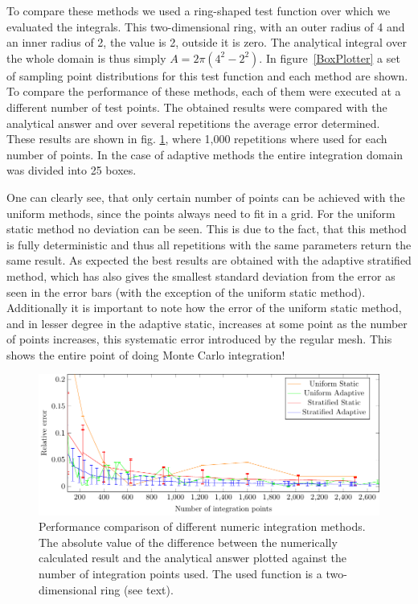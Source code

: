 To compare these methods we used a ring-shaped test function over which we evaluated the integrals. This two-dimensional ring, with an outer radius of 4 and an inner radius of 2, the value is 2, outside it is zero. The analytical integral over the whole domain is thus simply $ A=2\pi (4^2-2^2)$.  In figure~\ref{BoxPlotter} a set of sampling point distributions for this test function and each method are shown. To compare the performance of these methods, each of them were executed at a different number of test points. The obtained results were compared with the analytical answer and over several repetitions the average error determined. These results are shown in fig. \ref{MCerrs}, where 1,000 repetitions where used for each number of points. In the case of adaptive methods the entire integration domain was divided into 25 boxes.

One can clearly see, that only certain number of points can be achieved with the uniform methods, since the points always need to fit in a grid. For the uniform static method no deviation can be seen. This is due to the fact, that this method is fully deterministic and thus all repetitions with the same parameters return the same result.
As expected the best results are obtained with the adaptive stratified method, which has also gives the smallest standard deviation from the error as seen in the error bars (with the exception of the uniform static method).
Additionally it is important to note how the error of the uniform static method, and in lesser degree in the adaptive static, increases at some point as the number of points increases, this systematic error introduced by the regular mesh. This shows the entire point of doing Monte Carlo integration!
\begin{figure}[ht]
  \begin{center}
  \includegraphics[scale=1 ]{graphs/integration_test_ring.pdf}
  \caption{Performance comparison of different numeric integration methods. The absolute value of the difference between the numerically calculated result and the analytical answer plotted against the number of integration points used. The used function is a two-dimensional ring (see text).}
  \label{MCerrs}
  \end{center}
\end{figure}
